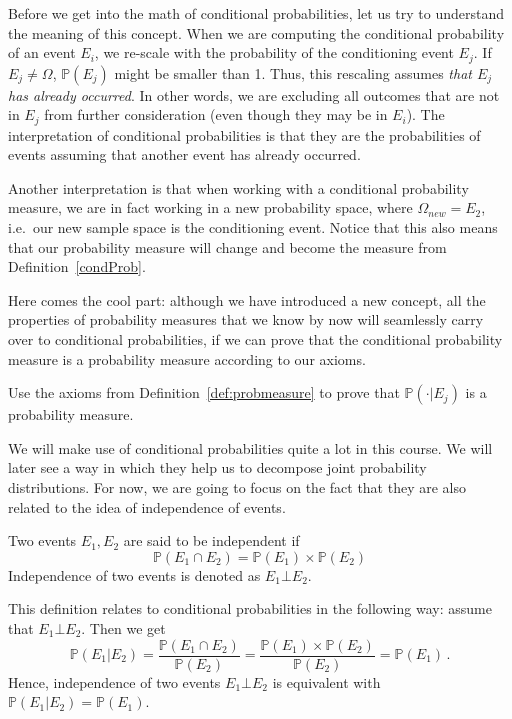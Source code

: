 Before we get into the math of conditional probabilities, let us try to understand the meaning of this concept. 
When we are computing the conditional probability of an event $ E_{i} $, we re-scale with the 
probability of the conditioning event $ E_{j} $. If $ E_{j} \not = \Omega $, $ \mathbb{P}(E_{j}) $
might be smaller than 1. Thus, this rescaling assumes \textit{that $ E_{j} $ has already occurred}. In other
words, we are excluding all outcomes that are not in $ E_{j} $ from further consideration (even though they
may be in $ E_{i} $). The interpretation of conditional probabilities is that they are the probabilities
of events assuming that another event has already occurred.

Another interpretation is that when working with a conditional probability measure, we are in fact working
in a new probability space, where $ \Omega_{new} = E_{2} $, i.e.\ our new sample space is the conditioning event.
Notice that this also means that our probability measure will change and become the
measure from Definition~\ref{condProb}.

Here comes the cool part: although we have introduced a new concept, all the properties of probability
measures that we know by now will seamlessly carry over to conditional probabilities, if we can prove
that the conditional probability measure is a probability measure according to our axioms.

\begin{Exercise}
Use the axioms from Definition~\ref{def:probmeasure} to prove that $ \mathbb{P}(\cdot|E_{j}) $ is a probability measure.
\end{Exercise} 

We will make use of conditional probabilities quite a lot in this course. We will later see a way in which
they help us to decompose joint probability distributions. For now, we are going to focus on the fact that
they are also related to the idea of independence of events.

\begin{Definition}[Independence]
Two events $ E_{1}, E_{2} $ are said to be independent if 
$$ \mathbb{P}(E_{1} \cap E_{2}) = \mathbb{P}(E_{1}) \times \mathbb{P}(E_{2}) $$
Independence of two events is denoted as $ E_{1} \bot E_{2} $.
\end{Definition}

This definition relates to conditional probabilities in the following way: assume that $ E_{1} \bot E_{2} $.
Then we get
\begin{equation}
\mathbb{P}(E_{1}|E_{2}) = \dfrac{\mathbb{P}(E_{1} \cap E_{2})}{\mathbb{P}(E_{2})}
= \dfrac{\mathbb{P}(E_{1}) \times
  \mathbb{P}(E_{2})}{\mathbb{P}(E_{2})} = \mathbb{P}(E_{1}) \, .
\end{equation}
Hence, independence of two events $ E_{1} \bot E_{2}$ is equivalent with $\mathbb{P}(E_{1}|E_{2}) = \mathbb{P}(E_{1}) $.

